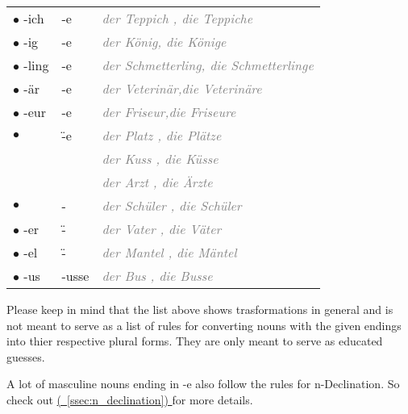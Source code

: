 \documentclass[a4paper,twocolumn,10pt]{article}
\newcommand{\newpar}
{\par \vspace{0.3cm}}
\newcommand{\refssec}[1]
{
	\hyperref[sec:#1]
	{
		(\textsection~\ref{ssec:#1})
	}
}
\begin{document}
\begin{xtabular}{lll}


		 $\bullet$ -ich  & -e     & \textcolor{gray}{\textit{der Teppich , die Teppiche} }\\
		 $\bullet$ -ig   & -e     & \textcolor{gray}{\textit{der König, die Könige} }\\
		 $\bullet$ -ling & -e     & \textcolor{gray}{\textit{der Schmetterling, die Schmetterlinge} }\\
		 $\bullet$ -är   & -e     & \textcolor{gray}{\textit{der Veterinär,die Veterinäre} }\\
		 $\bullet$ -eur   & -e    & \textcolor{gray}{\textit{der Friseur,die Friseure} }\\
		 $\bullet$       & \"{-}e & \textcolor{gray}{ \textit{der Platz , die Plätze} }\\
		                 &        & \textcolor{gray}{ \textit{der Kuss , die Küsse} }\\
		                 &        & \textcolor{gray}{ \textit{der Arzt , die Ärzte} }\\
		 $\bullet$       & -      & \textcolor{gray}{ \textit{der Schüler , die Schüler} }\\
		 $\bullet$ -er   & \"{-}  & \textcolor{gray}{ \textit{der Vater , die Väter} }\\
		 $\bullet$ -el   & \"{-}  & \textcolor{gray}{ \textit{der Mantel , die Mäntel} }\\
		 $\bullet$ -us   & -usse  & \textcolor{gray}{ \textit{der Bus , die Busse} }\\



\end{xtabular}

\vspace{0.2cm}

\linenumbers


Please keep in mind that the list above shows trasformations in general and is
not meant to serve as a list of rules for converting nouns with the given
endings into thier respective plural forms. They are only meant to serve as
educated guesses.\newpar

A lot of masculine nouns ending in -e also follow the rules for n-Declination.
So check out \refssec{n_declination}for more details.
\end{document}
